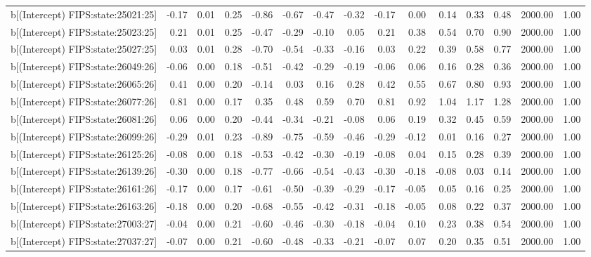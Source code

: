 \begin{table}[ht]
\begin{tabular}{rrrrrrrrrrrrrrr}
  b[(Intercept) FIPS:state:25021:25] & -0.17 & 0.01 & 0.25 & -0.86 & -0.67 & -0.47 & -0.32 & -0.17 & 0.00 & 0.14 & 0.33 & 0.48 & 2000.00 & 1.00 \\ 
  b[(Intercept) FIPS:state:25023:25] & 0.21 & 0.01 & 0.25 & -0.47 & -0.29 & -0.10 & 0.05 & 0.21 & 0.38 & 0.54 & 0.70 & 0.90 & 2000.00 & 1.00 \\ 
  b[(Intercept) FIPS:state:25027:25] & 0.03 & 0.01 & 0.28 & -0.70 & -0.54 & -0.33 & -0.16 & 0.03 & 0.22 & 0.39 & 0.58 & 0.77 & 2000.00 & 1.00 \\ 
  b[(Intercept) FIPS:state:26049:26] & -0.06 & 0.00 & 0.18 & -0.51 & -0.42 & -0.29 & -0.19 & -0.06 & 0.06 & 0.16 & 0.28 & 0.36 & 2000.00 & 1.00 \\ 
  b[(Intercept) FIPS:state:26065:26] & 0.41 & 0.00 & 0.20 & -0.14 & 0.03 & 0.16 & 0.28 & 0.42 & 0.55 & 0.67 & 0.80 & 0.93 & 2000.00 & 1.00 \\ 
  b[(Intercept) FIPS:state:26077:26] & 0.81 & 0.00 & 0.17 & 0.35 & 0.48 & 0.59 & 0.70 & 0.81 & 0.92 & 1.04 & 1.17 & 1.28 & 2000.00 & 1.00 \\ 
  b[(Intercept) FIPS:state:26081:26] & 0.06 & 0.00 & 0.20 & -0.44 & -0.34 & -0.21 & -0.08 & 0.06 & 0.19 & 0.32 & 0.45 & 0.59 & 2000.00 & 1.00 \\ 
  b[(Intercept) FIPS:state:26099:26] & -0.29 & 0.01 & 0.23 & -0.89 & -0.75 & -0.59 & -0.46 & -0.29 & -0.12 & 0.01 & 0.16 & 0.27 & 2000.00 & 1.00 \\ 
  b[(Intercept) FIPS:state:26125:26] & -0.08 & 0.00 & 0.18 & -0.53 & -0.42 & -0.30 & -0.19 & -0.08 & 0.04 & 0.15 & 0.28 & 0.39 & 2000.00 & 1.00 \\ 
  b[(Intercept) FIPS:state:26139:26] & -0.30 & 0.00 & 0.18 & -0.77 & -0.66 & -0.54 & -0.43 & -0.30 & -0.18 & -0.08 & 0.03 & 0.14 & 2000.00 & 1.00 \\ 
  b[(Intercept) FIPS:state:26161:26] & -0.17 & 0.00 & 0.17 & -0.61 & -0.50 & -0.39 & -0.29 & -0.17 & -0.05 & 0.05 & 0.16 & 0.25 & 2000.00 & 1.00 \\ 
  b[(Intercept) FIPS:state:26163:26] & -0.18 & 0.00 & 0.20 & -0.68 & -0.55 & -0.42 & -0.31 & -0.18 & -0.05 & 0.08 & 0.22 & 0.37 & 2000.00 & 1.00 \\ 
  b[(Intercept) FIPS:state:27003:27] & -0.04 & 0.00 & 0.21 & -0.60 & -0.46 & -0.30 & -0.18 & -0.04 & 0.10 & 0.23 & 0.38 & 0.54 & 2000.00 & 1.00 \\ 
  b[(Intercept) FIPS:state:27037:27] & -0.07 & 0.00 & 0.21 & -0.60 & -0.48 & -0.33 & -0.21 & -0.07 & 0.07 & 0.20 & 0.35 & 0.51 & 2000.00 & 1.00 \\ 

\end{tabular}
\end{table}
